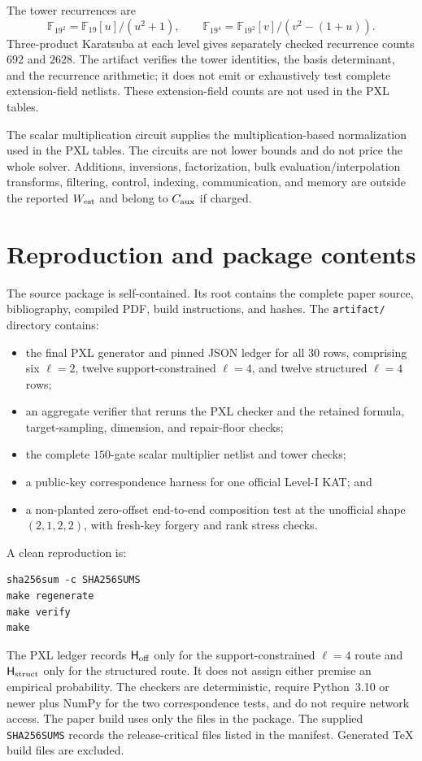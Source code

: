 \documentclass[11pt]{article}
\newcommand{\F}{\mathbb F}
\begin{document}
The tower recurrences are
\[
 \F_{19^2}=\F_{19}[u]/(u^2+1),
 \qquad
 \F_{19^4}=\F_{19^2}[v]/(v^2-(1+u)).
\]
Three-product Karatsuba at each level gives separately checked recurrence
counts $692$ and $2628$.  The artifact verifies the tower identities, the
basis determinant, and the recurrence arithmetic; it does not emit or
exhaustively test complete extension-field netlists.  These extension-field
counts are not used in the PXL tables.

The scalar multiplication circuit supplies the multiplication-based
normalization used in the PXL tables.  The circuits are not lower bounds and
do not price the whole solver.  Additions,
inversions, factorization, bulk evaluation/interpolation transforms,
filtering, control, indexing, communication, and memory are outside the
reported $W_{\rm est}$ and belong to $C_{\rm aux}$ if charged.

\clearpage
\section{Reproduction and package contents}\label{app:artifact}
The source package is self-contained.  Its root contains the complete paper
source, bibliography, compiled PDF, build instructions, and hashes.  The
\texttt{artifact/} directory contains:
\begin{itemize}
\item the final PXL generator and pinned JSON ledger for all 30 rows,
      comprising six $\ell=2$, twelve support-constrained $\ell=4$, and
      twelve structured $\ell=4$ rows;
\item an aggregate verifier that reruns the PXL checker and the retained
      formula, target-sampling, dimension, and repair-floor checks;
\item the complete $150$-gate scalar multiplier netlist and tower checks;
\item a public-key correspondence harness for one official Level-I KAT; and
\item a non-planted zero-offset end-to-end composition test at the unofficial
      shape $(2,1,2,2)$, with fresh-key forgery and rank stress checks.
\end{itemize}

A clean reproduction is:
\begin{verbatim}
sha256sum -c SHA256SUMS
make regenerate
make verify
make
\end{verbatim}
The PXL ledger records $\mathsf H_{\rm off}$ only for the
support-constrained $\ell=4$ route and $\mathsf H_{\rm struct}$ only for the
structured route.  It does not assign either premise an empirical
probability.  The checkers are deterministic, require Python~3.10 or newer
plus NumPy for the two correspondence tests, and do not require network
access.  The paper build uses only the files in the package.  The supplied
\texttt{SHA256SUMS} records the release-critical files listed in the manifest.
Generated TeX build files are excluded.
\end{document}
